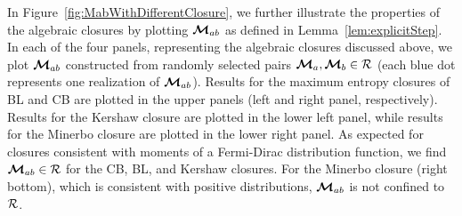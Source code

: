 In Figure~\ref{fig:MabWithDifferentClosure}, we further illustrate the properties of the algebraic closures by plotting $\boldsymbol{\mathcal{M}}_{ab}$ as defined in Lemma~\ref{lem:explicitStep}.  
In each of the four panels, representing the algebraic closures discussed above, we plot $\boldsymbol{\mathcal{M}}_{ab}$ constructed from randomly selected pairs $\boldsymbol{\mathcal{M}}_{a},\boldsymbol{\mathcal{M}}_{b}\in\mathcal{R}$ (each blue dot represents one realization of $\boldsymbol{\mathcal{M}}_{ab}$).  
Results for the maximum entropy closures of BL and CB are plotted in the upper panels (left and right panel, respectively).  
Results for the Kershaw closure are plotted in the lower left panel, while results for the Minerbo closure are plotted in the lower right panel.  
As expected for closures consistent with moments of a Fermi-Dirac distribution function, we find $\boldsymbol{\mathcal{M}}_{ab}\in\mathcal{R}$ for the CB, BL, and Kershaw closures.  
For the Minerbo closure (right bottom), which is consistent with positive distributions, $\boldsymbol{\mathcal{M}}_{ab}$ is not confined to $\mathcal{R}$.  
